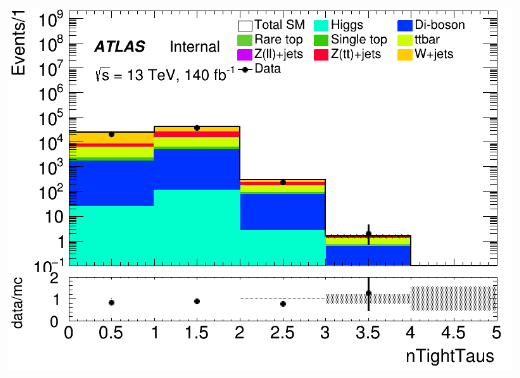 \documentclass[usenames,dvipsnames]{beamer}
\begin{document}
\begin{frame}
\begin{minipage}{0.32\textwidth}
        \includegraphics[width=\textwidth]{graphics/LH_met/LH_met_nTightTaus.png}
    \end{minipage}
\end{frame}
\end{document}
